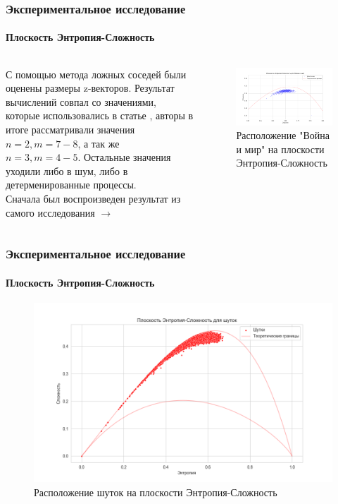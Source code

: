 \documentclass[aspectratio=169]{beamer}
\begin{document}
\begin{frame}
\frametitle{Экспериментальное исследование}
\framesubtitle{Плоскость Энтропия-Сложность}

	\begin{columns}
	 С помощью метода ложных соседей были оценены размеры z-векторов. Результат вычислений совпал со значениями, которые использовались в статье \cite{gromov_semantic_2023}, авторы в итоге рассматривали значения $n = 2, m = 7 - 8$, а так же $n = 3, m = 4 - 5$. Остальные значения уходили либо в шум, либо в детерменированные процессы. \\ Сначала был воспроизведен результат из самого исследования $\rightarrow$
	\begin{figure}[htbp]
            \centering
            \includegraphics[scale=0.26]{image3}
            \caption{Расположение "Война и мир" на плоскости Энтропия-Сложность}
            \label{fig:image3}
        \end{figure}
	\end{columns}
	
\end{frame}

\begin{frame}
\frametitle{Экспериментальное исследование}
\framesubtitle{Плоскость Энтропия-Сложность}
	
	\begin{figure}[htbp]
            \centering
            \includegraphics[scale=0.4]{image4}
            \caption{Расположение шуток на плоскости Энтропия-Сложность}
            \label{fig:image1}
        \end{figure}

\end{frame}
\end{document}
